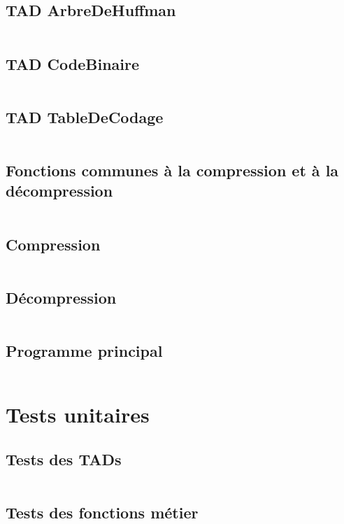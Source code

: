 \documentclass[10pt]{report}
\begin{document}
            \subsection{TAD ArbreDeHuffman}
                \inputminted[breaklines]{c}{../src/arbreDeHuffman.c}
            \subsection{TAD CodeBinaire}
                \inputminted[breaklines]{c}{../src/codeBinaire.c}
            \subsection{TAD TableDeCodage}
                \inputminted[breaklines]{c}{../src/tableDeCodage.c}
            \subsection{Fonctions communes à la compression et à la décompression}
                \inputminted[breaklines]{c}{../src/construireArbreDeHuffman.c}
            \subsection{Compression}
                \inputminted[breaklines]{c}{../src/compression.c}
            \subsection{Décompression}
                \inputminted[breaklines]{c}{../src/decompression.c} 
            \subsection{Programme principal}
                \inputminted[breaklines]{c}{../src/main.c}
        
        \newpage
        \section{Tests unitaires}
            \subsection{Tests des TADs}
                \inputminted[breaklines]{c}{../src/testsTADs.c}
            \subsection{Tests des fonctions métier}
                \inputminted[breaklines]{c}{../src/testsFonctionsMetier.c}
\end{document}
